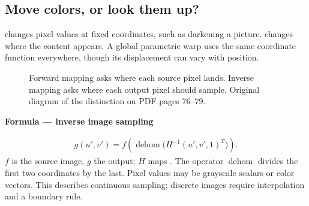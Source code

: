 \documentclass[letterpaper,11pt,english,openany,oneside]{jupyterBook}
\begin{document}
\subsection{Move colors, or look them up?}
\label{\detokenize{lectures/lecture02/warping:move-colors-or-look-them-up}}
\sphinxAtStartPar
{} changes pixel values at fixed coordinates, such as darkening a picture.  changes where the content appears. A global parametric warp uses the same coordinate function everywhere, though its displacement can vary with position.

\begin{figure}[H]
\centering
\capstart

\noindent{}
\caption{Forward mapping asks where each source pixel lands. Inverse mapping asks where each output pixel should sample. Original diagram of the distinction on PDF pages 76–79.}\label{\detokenize{lectures/lecture02/warping:fig-lec02-warp-grids}}\end{figure}

\begin{TextbookBox}
\textbf{Formula — inverse image sampling}\par\smallskip
\begin{equation}\label{equation:lectures/lecture02/warping:eq-lec02-inversewarp}
\begin{split}g(u',v')=f\!\left(\operatorname{dehom}\bigl(H^{-1}(u',v',1)^T\bigr)\right).\end{split}
\end{equation}
\sphinxAtStartPar
\(f\) is the source image, \(g\) the output; \(H\) maps . The operator \(\operatorname{dehom}\) divides the first two coordinates by the last. Pixel values may be grayscale scalars or color vectors. This describes continuous sampling; discrete images require interpolation and a boundary rule.

\end{TextbookBox}
\end{document}
